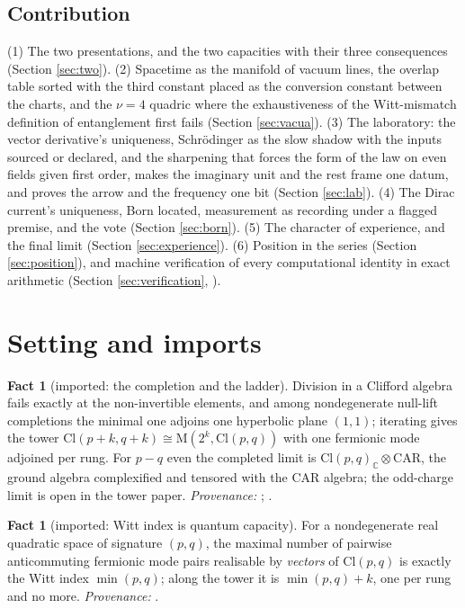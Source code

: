\documentclass[11pt]{article}
\theoremstyle{definition}
\newtheorem{fact}[theorem]{Fact}
\newcommand{\Cl}{\mathrm{Cl}}
\newcommand{\C}{\mathbb{C}}
\newcommand{\Mat}{\mathrm{M}}
\begin{document}
\subsection*{Contribution}

(1) The two presentations, and the two capacities with their three consequences (Section \ref{sec:two}). (2) Spacetime as the manifold of vacuum lines, the overlap table sorted with the third constant placed as the conversion constant between the charts, and the $\nu = 4$ quadric where the exhaustiveness of the Witt-mismatch definition of entanglement first fails (Section \ref{sec:vacua}). (3) The laboratory: the vector derivative's uniqueness, Schr\"odinger as the slow shadow with the inputs sourced or declared, and the sharpening that forces the form of the law on even fields given first order, makes the imaginary unit and the rest frame one datum, and proves the arrow and the frequency one bit (Section \ref{sec:lab}). (4) The Dirac current's uniqueness, Born located, measurement as recording under a flagged premise, and the vote (Section \ref{sec:born}). (5) The character of experience, and the final limit (Section \ref{sec:experience}). (6) Position in the series (Section \ref{sec:position}), and machine verification of every computational identity in exact arithmetic (Section \ref{sec:verification}, \cite{ButlerVerifyT16}).

\section{Setting and imports}\label{sec:setting}

\begin{fact}[imported: the completion and the ladder]\label{fact:completion}
Division in a Clifford algebra fails exactly at the non-invertible elements, and among nondegenerate null-lift completions the minimal one adjoins one hyperbolic plane $(1,1)$; iterating gives the tower $\Cl(p+k, q+k) \cong \Mat(2^{k}, \Cl(p,q))$ with one fermionic mode adjoined per rung. For $p - q$ even the completed limit is $\Cl(p,q)_{\C} \otimes \mathrm{CAR}$, the ground algebra complexified and tensored with the CAR algebra; the odd-charge limit is open in the tower paper. \emph{Provenance:} \cite[Thm.~4.13]{ButlerT1}; \cite[Thm.~5.6, Question~5.8, Cor.~6.2]{ButlerT3}.
\end{fact}

\begin{fact}[imported: Witt index is quantum capacity]\label{fact:capacity}
For a nondegenerate real quadratic space of signature $(p,q)$, the maximal number of pairwise anticommuting fermionic mode pairs realisable by \emph{vectors} of $\Cl(p,q)$ is exactly the Witt index $\min(p,q)$; along the tower it is $\min(p,q) + k$, one per rung and no more. \emph{Provenance:} \cite[Thm.~4.3]{ButlerT3}.
\end{fact}
\end{document}
